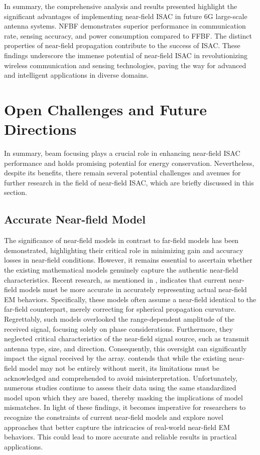\documentclass[10pt,journal,twocolumn,twoside]{IEEEtran} %
\begin{document}
 In summary, the comprehensive analysis and results presented highlight the significant advantages of implementing near-field ISAC in future 6G large-scale antenna systems. NFBF demonstrates superior performance in communication rate, sensing accuracy, and power consumption compared to FFBF. The distinct properties of near-field propagation contribute to the success of ISAC. These findings underscore the immense potential of near-field ISAC in revolutionizing wireless communication and sensing technologies, paving the way for advanced and intelligent applications in diverse domains.



\section{Open Challenges and Future Directions} %
In summary, beam focusing plays a crucial role in enhancing near-field ISAC performance and holds promising potential for energy conservation. Nevertheless, despite its benefits, there remain several potential challenges and avenues for further research in the field of near-field ISAC, which are briefly discussed in this section.
\subsection{Accurate Near-field Model} 
The significance of near-field models in contrast to far-field models has been demonstrated, highlighting their critical role in minimizing gain and accuracy losses in near-field conditions. However, it remains essential to ascertain whether the existing mathematical models genuinely capture the authentic near-field characteristics. Recent research, as mentioned in \cite{8736783}, indicates that current near-field models must be more accurate in accurately representing actual near-field EM behaviors. Specifically, these models often assume a near-field identical to the far-field counterpart, merely correcting for spherical propagation curvature. Regrettably, such models overlooked the range-dependent amplitude of the received signal, focusing solely on phase considerations. Furthermore, they neglected critical characteristics of the near-field signal source, such as transmit antenna type, size, and direction. Consequently, this oversight can significantly impact the signal received by the array.
\cite{8736783} contends that while the existing near-field model may not be entirely without merit, its limitations must be acknowledged and comprehended to avoid misinterpretation. Unfortunately, numerous studies continue to assess their data using the same standardized model upon which they are based, thereby masking the implications of model mismatches.
In light of these findings, it becomes imperative for researchers to recognize the constraints of current near-field models and explore novel approaches that better capture the intricacies of real-world near-field EM behaviors. This could lead to more accurate and reliable results in practical applications.
\end{document}
